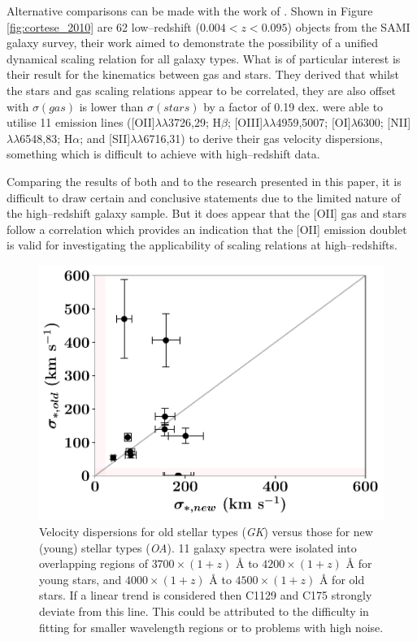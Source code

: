 \documentclass[12pt, twocolumn, nofootinbib]{revtex4-1}    %
\begin{document}
Alternative comparisons can be made with the work of \cite{2014ApJ...795L..37C}. Shown in Figure \ref{fig:cortese_2010} are 62 low--redshift ($0.004<z<0.095$) objects from the SAMI galaxy survey, their work aimed to demonstrate the possibility of a unified dynamical scaling relation for all galaxy types. What is of particular interest is their result for the kinematics between gas and stars. They derived that whilst the stars and gas scaling relations appear to be correlated, they are also offset with $\sigma(gas)$ is lower than $\sigma(stars)$ by a factor of 0.19 dex. \cite{2014ApJ...795L..37C} were able to utilise 11 emission lines ([OII]$\lambda\lambda$3726,29; H$\beta$; [OIII]$\lambda\lambda$4959,5007; [OI]$\lambda$6300; [NII]$\lambda\lambda$6548,83; H$\alpha$; and [SII]$\lambda\lambda$6716,31) to derive their gas velocity dispersions, something which is difficult to achieve with high--redshift data. 

Comparing the results of both \cite{2009ApJ...699..638H} and \cite{2014ApJ...795L..37C} to the research presented in this paper, it is difficult to draw certain and conclusive statements due to the limited nature of the high--redshift galaxy sample. But it does appear that the [OII] gas and stars follow a correlation which provides an indication that the [OII] emission doublet is valid for investigating the applicability of scaling relations at high--redshifts.

\begin{figure}
\includegraphics[width=1.0\linewidth]{data/sigma_stars_old_vs_new}
\caption{Velocity dispersions for old stellar types (\textit{GK}) versus those for new (young) stellar types (\textit{OA}). 11 galaxy spectra were isolated into overlapping regions of $3700\times (1+z)$ {\AA} to $4200\times(1+z)$ {\AA} for young stars, and $4000\times (1+z)$ {\AA} to $4500\times(1+z)$ {\AA} for old stars. If a linear trend is considered then C1129 and C175 strongly deviate from this line. This could be attributed to the difficulty in fitting for smaller wavelength regions or to problems with high noise. }
\label{fig:velocity_dispersions_old_new}
\end{figure} 
\end{document}
